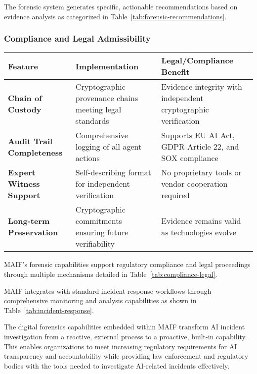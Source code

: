 \documentclass[conference]{IEEEtran}
\begin{document}
The forensic system generates specific, actionable recommendations based on evidence analysis as categorized in Table~\ref{tab:forensic-recommendations}.

\subsubsection{Compliance and Legal Admissibility}

\begin{table*}[!t]
\renewcommand{\arraystretch}{1.3}
\caption{MAIF Compliance and Legal Admissibility Features}
\label{tab:compliance-legal}
\centering
\footnotesize
\begin{tabular}{p{3cm}p{6cm}p{5cm}}
\toprule
\textbf{Feature} & \textbf{Implementation} & \textbf{Legal/Compliance Benefit} \\
\midrule
\textbf{Chain of Custody} & Cryptographic provenance chains meeting legal standards & Evidence integrity with independent cryptographic verification \\
\textbf{Audit Trail Completeness} & Comprehensive logging of all agent actions & Supports EU AI Act, GDPR Article 22, and SOX compliance \\
\textbf{Expert Witness Support} & Self-describing format for independent verification & No proprietary tools or vendor cooperation required \\
\textbf{Long-term Preservation} & Cryptographic commitments ensuring future verifiability & Evidence remains valid as technologies evolve \\
\bottomrule
\end{tabular}
\end{table*}

MAIF's forensic capabilities support regulatory compliance and legal proceedings through multiple mechanisms detailed in Table~\ref{tab:compliance-legal}.



MAIF integrates with standard incident response workflows through comprehensive monitoring and analysis capabilities as shown in Table~\ref{tab:incident-response}.

The digital forensics capabilities embedded within MAIF transform AI incident investigation from a reactive, external process to a proactive, built-in capability. This enables organizations to meet increasing regulatory requirements for AI transparency and accountability while providing law enforcement and regulatory bodies with the tools needed to investigate AI-related incidents effectively.
\end{document}
